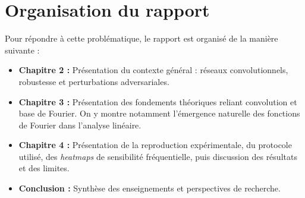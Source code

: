 \section*{Organisation du rapport}

Pour répondre à cette problématique, le rapport est organisé de la manière suivante :

\begin{itemize}[label=\textbullet, leftmargin=1.5cm]
    \item \textbf{Chapitre 2 :} Présentation du contexte général : réseaux convolutionnels, robustesse et perturbations adversariales.
    \item \textbf{Chapitre 3 :} Présentation des fondements théoriques reliant convolution et base de Fourier. 
    On y montre notamment l'émergence naturelle des fonctions de Fourier dans l'analyse linéaire.
    \item \textbf{Chapitre 4 :} Présentation de la reproduction expérimentale, du protocole utilisé, des \textit{heatmaps} 
    de sensibilité fréquentielle, puis discussion des résultats et des limites.
    \item \textbf{Conclusion :} Synthèse des enseignements et perspectives de recherche.
\end{itemize}
